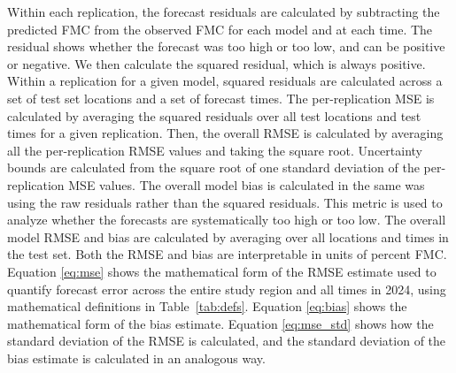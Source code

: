 \documentclass[fire,article,submit,pdftex,moreauthors]{Definitions/mdpi}
\begin{document}
Within each replication, the forecast residuals are calculated by subtracting the predicted FMC from the observed FMC for each model and at each time. The residual shows whether the forecast was too high or too low, and can be positive or negative. We then calculate the squared residual, which is always positive. Within a replication for a given model, squared residuals are calculated across a set of test set locations and a set of forecast times. The per-replication MSE is calculated by averaging the squared residuals over all test locations and test times for a given replication. Then, the overall RMSE is calculated by averaging all the per-replication RMSE values and taking the square root. Uncertainty bounds are calculated from the square root of one standard deviation of the per-replication MSE values. The overall model bias is calculated in the same was using the raw residuals rather than the squared residuals. This metric is used to analyze whether the forecasts are systematically too high or too low. The overall model RMSE and bias are calculated by averaging over all locations and times in the test set. Both the RMSE and bias are interpretable in units of percent FMC. Equation \ref{eq:mse} shows the mathematical form of the RMSE estimate used to quantify forecast error across the entire study region and all times in 2024, using mathematical definitions in Table~\ref{tab:defs}. Equation \ref{eq:bias} shows the mathematical form of the bias estimate. Equation \ref{eq:mse_std} shows how the standard deviation of the RMSE is calculated, and the standard deviation of the bias estimate is calculated in an analogous way.
\end{document}
